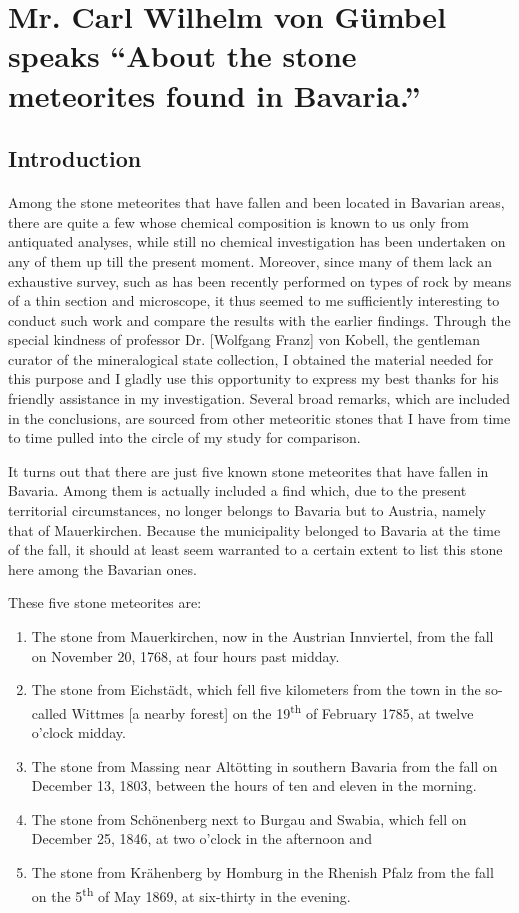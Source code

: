 \documentclass[a4paper, 12pt, oneside]{article}
\begin{document}
\section{Mr. Carl Wilhelm von Gümbel speaks ``About the stone meteorites found in Bavaria.''}
\subsection*{Introduction}
\paragraph{}
Among the stone meteorites that have fallen and been located in Bavarian areas, there are quite a few whose chemical composition is known to us only from antiquated analyses, while still no chemical investigation has been undertaken on any of them up till the present moment. Moreover, since many of them lack an exhaustive survey, such as has been recently performed on types of rock by means of a thin section and microscope, it thus seemed to me sufficiently interesting to conduct such work and compare the results with the earlier findings. Through the special kindness of professor Dr. [Wolfgang Franz] von Kobell, the gentleman curator of the mineralogical state collection, I obtained the material needed for this purpose and I gladly use this opportunity to express my best thanks for his friendly assistance in my investigation. Several broad remarks, which are included in the conclusions, are sourced from other meteoritic stones that I have from time to time pulled into the circle of my study for comparison.

It turns out that there are just five known stone meteorites that have fallen in Bavaria. Among them is actually included a find which, due to the present territorial circumstances, no longer belongs to Bavaria but to Austria, namely that of Mauerkirchen. Because the municipality belonged to Bavaria at the time of the fall, it should at least seem warranted to a certain extent to list this stone here among the Bavarian ones.

These five stone meteorites are:
\begin{enumerate}
    \item The stone from Mauerkirchen, now in the Austrian Innviertel, from the fall on November 20, 1768, at four hours past midday.
    \item The stone from Eichstädt, which fell five kilometers from the town in the so-called Wittmes [a nearby forest] on the 19\textsuperscript{th} of February 1785, at twelve o'clock midday.
    \item The stone from Massing near Altötting in southern Bavaria from the fall on December 13, 1803, between the hours of ten and eleven in the morning.
    \item The stone from Schönenberg next to Burgau and Swabia, which fell on December 25, 1846, at two o'clock in the afternoon and
    \item The stone from Krähenberg by Homburg in the Rhenish Pfalz from the fall on the 5\textsuperscript{th} of May 1869, at six-thirty in the evening.
\end{enumerate}
\end{document}
